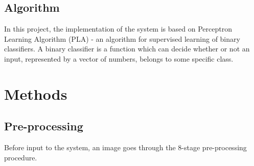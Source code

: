 \documentclass[12pt, a4paper, oneside]{article}
\begin{document}
    	\subsection{Algorithm}
    		In this project, the implementation of the system is based on Perceptron Learning Algorithm (PLA) - an algorithm for supervised learning of binary classifiers. A binary classifier is a function which can decide whether or not an input, represented by a vector of numbers, belongs to some specific class. 
    		
    \section{Methods}
    	\subsection{Pre-processing}
    		Before input to the system, an image goes through the 8-stage pre-processing procedure. 
\end{document}
